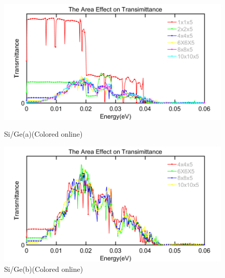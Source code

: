 \begin{figure}
\begin{minipage}[t]{0.5\linewidth}
\centering
\includegraphics[width=\textwidth]{SiGe_Big.png}
\caption{Si/Ge(a)(Colored online)}
\label{fig:SiGea}
\end{minipage}%
\begin{minipage}[t]{0.5\linewidth}
\centering
\includegraphics[width=\textwidth]{SiGe_sub.png}
\caption{Si/Ge(b)(Colored online)}
\label{fig:SiGeb}
\end{minipage}
\end{figure}
